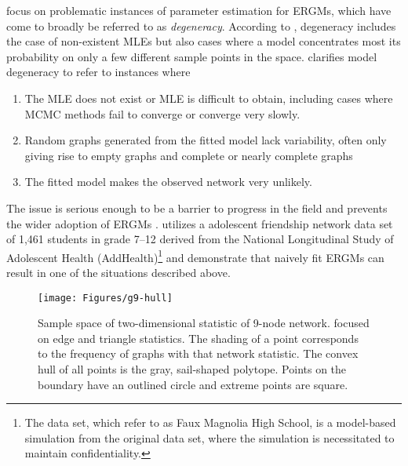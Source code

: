 \citet*{Handcock:degeneracy, Rinaldo:2009} focus on problematic instances of parameter 
estimation for ERGMs, which have come to broadly be referred 
to as \emph{degeneracy}.  
According to \citet{Handcock:degeneracy}, degeneracy includes the 
case of non-existent MLEs but also 
cases where a model concentrates most its probability on only a few different sample 
points in the space.  \citet{Rinaldo:2009} clarifies model degeneracy to refer 
to instances where
\begin{enumerate}
\item The MLE does not exist or   
 MLE is difficult to obtain, including cases where MCMC methods fail to converge
or converge very slowly.
\item Random graphs generated from the fitted model lack variability, often only 
giving rise to empty graphs and complete or nearly complete graphs
\item The fitted model makes the observed network very unlikely.
\end{enumerate}

%
The issue is serious enough to be a barrier to progress in the field and 
prevents the wider adoption of ERGMs \citep{advancesp*}.  
\citet{statnet-tutorial} utilizes a adolescent friendship network data set 
of 1,461 students in grade 7--12 derived from the National Longitudinal Study of 
Adolescent Health (AddHealth)\footnote{The data set, which \citeauthor{statnet-tutorial} refer to as Faux 
Magnolia High School, is a model-based simulation from the original data set, where 
the simulation is necessitated to maintain confidentiality.
} and demonstrate that naively fit ERGMs can result in one of the
situations described above.

\begin{figure}[h]
\centering
\texttt{[image: Figures/g9-hull]}
\caption[Sample space of two-dimensional statistic of 9-node network]{Sample space 
of two-dimensional statistic of 9-node network.  \citet{Rinaldo:2009} focused
on edge and triangle statistics.  The shading of a point corresponds to 
the frequency of graphs with that network statistic.  
The convex hull of all points is the gray, sail-shaped polytope.  Points on the 
boundary have an outlined circle and extreme points are square.}
\label{F:g9-hull}
\end{figure}

